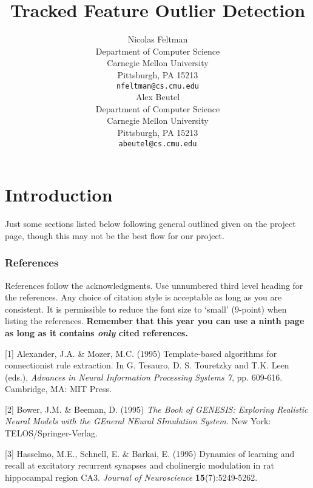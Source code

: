 \documentclass{article} %
\title{Tracked Feature Outlier Detection}
\author{
Nicolas Feltman\\
Department of Computer Science\\
Carnegie Mellon University\\
Pittsburgh, PA 15213 \\
\texttt{nfeltman@cs.cmu.edu} \\
\And
Alex Beutel\\
Department of Computer Science\\
Carnegie Mellon University\\
Pittsburgh, PA 15213 \\
\texttt{abeutel@cs.cmu.edu} 
}
\begin{document}
\maketitle

\begin{abstract}

\end{abstract}


\section{Introduction} %
\label{sec:Introduction}
Just some sections listed below following general outlined given on the project
page, though this may not be the best flow for our project.











\subsubsection*{References}

References follow the acknowledgments. Use unnumbered third level heading for
the references. Any choice of citation style is acceptable as long as you are
consistent. It is permissible to reduce the font size to `small' (9-point) 
when listing the references. {\bf Remember that this year you can use
a ninth page as long as it contains \emph{only} cited references.}

\small{
[1] Alexander, J.A. \& Mozer, M.C. (1995) Template-based algorithms
for connectionist rule extraction. In G. Tesauro, D. S. Touretzky
and T.K. Leen (eds.), {\it Advances in Neural Information Processing
Systems 7}, pp. 609-616. Cambridge, MA: MIT Press.

[2] Bower, J.M. \& Beeman, D. (1995) {\it The Book of GENESIS: Exploring
Realistic Neural Models with the GEneral NEural SImulation System.}
New York: TELOS/Springer-Verlag.

[3] Hasselmo, M.E., Schnell, E. \& Barkai, E. (1995) Dynamics of learning
and recall at excitatory recurrent synapses and cholinergic modulation
in rat hippocampal region CA3. {\it Journal of Neuroscience}
{\bf 15}(7):5249-5262.
}
\end{document}

